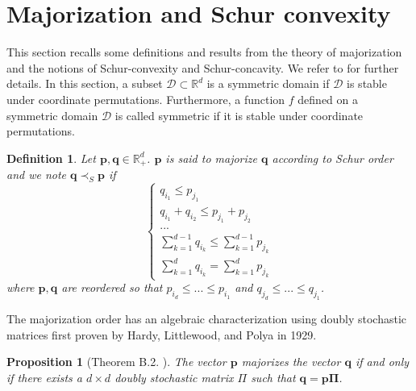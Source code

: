 \documentclass[twoside,11pt]{book}
\newtheorem{proposition}{Proposition}
\newtheorem{definition}{Definition}
\numberwithin{theorem}{chapter}
\numberwithin{definition}{chapter}
\numberwithin{proposition}{chapter}
\numberwithin{corollary}{chapter}
\numberwithin{example}{chapter}
\numberwithin{lemma}{chapter}
\numberwithin{assumption}{chapter}
\begin{document}
\section{Majorization and Schur convexity}
\label{app:majorization}


This section recalls some definitions and results from the theory of majorization and the notions of Schur-convexity and Schur-concavity. We refer to \citep{MaOlAr11} for further details. In this section, a subset $\mathcal{D} \subset \mathbb{R}^{d}$ is a symmetric domain if $\mathcal{D}$ is stable under coordinate permutations. Furthermore, a function $f$ defined on a symmetric domain $\mathcal{D}$ is called symmetric if it is stable under coordinate permutations.

\begin{definition}\label{def:majorization}
Let $\bm{p},\bm{q} \in \mathbb{R}_{+}^{d}$. $\bm{p}$ is said to majorize $\bm{q}$ according to Schur order and we note $\bm{q} \prec_{S} \bm{p}$ if
\begin{equation}
\left\{
    \begin{array}{ll}
        q_{i_{1}} \leq p_{j_{1}} \\
        q_{i_{1}} + q_{i_{2}} \leq p_{j_{1}} + p_{j_{2}} \\
        ... \\
        \sum\limits_{k=1}^{d-1} q_{i_{k}} \leq \sum\limits_{k=1}^{d-1} p_{j_{k}}\\
        \sum\limits_{k=1}^{d} q_{i_{k}} = \sum\limits_{k=1}^{d} p_{j_{k}}
    \end{array}
\right.
\end{equation}
where $\bm{p},\bm{q}$ are reordered so that $p_{i_{d}} \leq ... \leq p_{i_{1}}$ and $q_{j_{d}} \leq ... \leq q_{j_{1}}$.
\end{definition}
The majorization order has an algebraic characterization using doubly stochastic matrices first proven by Hardy, Littlewood, and Polya in 1929.
\begin{proposition}[Theorem B.2. \citealp{MaOlAr11}]
The vector $\bm{p}$ majorizes the vector $\bm{q}$ if and only if there exists a $d \times d$ doubly stochastic matrix $\Pi$ such that $\bm{q} = \bm{p \Pi}$.
\end{proposition}
\end{document}
